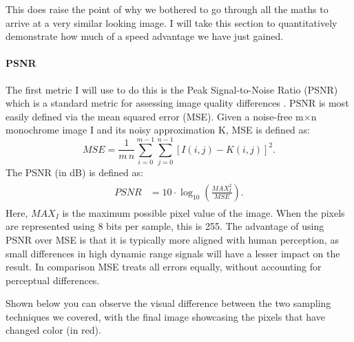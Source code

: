 \documentclass[12pt]{article}
\begin{document}
This does raise the point of why we bothered to go through all the maths to arrive at a very similar looking image. I will take this section to quantitatively demonstrate how much of a speed advantage we have just gained.

\paragraph{PSNR} The first metric I will use to do this is the Peak Signal-to-Noise Ratio (PSNR) which is a standard metric for assessing image quality differences \cite{imagequality}. PSNR is most easily defined via the mean squared error (MSE). Given a noise-free m×n monochrome image I and its noisy approximation K, MSE is defined as:
\[
    {\displaystyle {\mathit {MSE}}={\frac {1}{m\,n}}\sum _{i=0}^{m-1}\sum _{j=0}^{n-1}[I(i,j)-K(i,j)]^{2}.}
\]
The PSNR (in dB) is defined as:
\[
    \begin{array}{c} {\displaystyle {\begin{aligned}{\mathit {PSNR}}&=10\cdot \log _{10}\left({\frac {{\mathit {MAX}}_{I}^{2}}{\mathit {MSE}}}\right).\end{aligned}}} \end{array}
\]
Here, $MAX_I$ is the maximum possible pixel value of the image. When the pixels are represented using 8 bits per sample, this is 255. The advantage of using PSNR over MSE is that it is typically more aligned with human perception, as small differences in high dynamic range signals will have a lesser impact on the result. In comparison MSE treats all errors equally, without accounting for perceptual differences.

Shown below you can observe the visual difference between the two sampling techniques we covered, with the final image showcasing the pixels that have changed color (in red).
\end{document}
